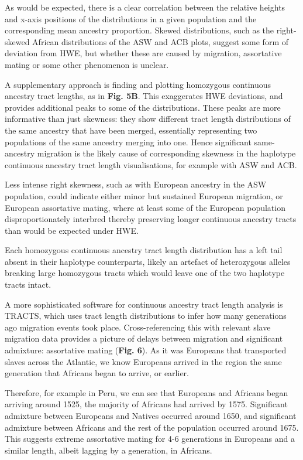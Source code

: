 \documentclass[11pt]{article}
\begin{document}
As would be expected, there is a clear correlation between the relative heights and x-axis positions of the distributions in a given population and the corresponding mean ancestry proportion. Skewed distributions, such as the right-skewed African distributions of the ASW and ACB plots, suggest some form of deviation from HWE, but whether these are caused by migration, assortative mating or some other phenomenon is unclear.

A supplementary approach is finding and plotting homozygous continuous ancestry tract lengths, as in \textbf{Fig. 5B}. This exaggerates HWE deviations, and provides additional peaks to some of the distributions. These peaks are more informative than just skewness: they show different tract length distributions of the same ancestry that have been merged, essentially representing two populations of the same ancestry merging into one. Hence significant same-ancestry migration is the likely cause of corresponding skewness in the haplotype continuous ancestry tract length visualisations, for example with ASW and ACB.

Less intense right skewness, such as with European ancestry in the ASW population, could indicate either minor but sustained European migration, or European assortative mating, where at least some of the European population disproportionately interbred thereby preserving longer continuous ancestry tracts than would be expected under HWE.

Each homozygous continuous ancestry tract length distribution has a left tail absent in their haplotype counterparts, likely an artefact of heterozygous alleles breaking large homozygous tracts which would leave one of the two haplotype tracts intact.

A more sophisticated software for continuous ancestry tract length analysis is TRACTS, which uses tract length distributions to infer how many generations ago migration events took place. Cross-referencing this with relevant slave migration data provides a picture of delays between migration and significant admixture: assortative mating (\textbf{Fig. 6}). As it was Europeans that transported slaves across the Atlantic, we know Europeans arrived in the region the same generation that Africans began to arrive, or earlier.

Therefore, for example in Peru, we can see that Europeans and Africans began arriving around 1525, the majority of Africans had arrived by 1575. Significant admixture between Europeans and Natives occurred around 1650, and significant admixture between Africans and the rest of the population occurred around 1675. This suggests extreme assortative mating for 4-6 generations in Europeans and a similar length, albeit lagging by a generation, in Africans.
\end{document}
